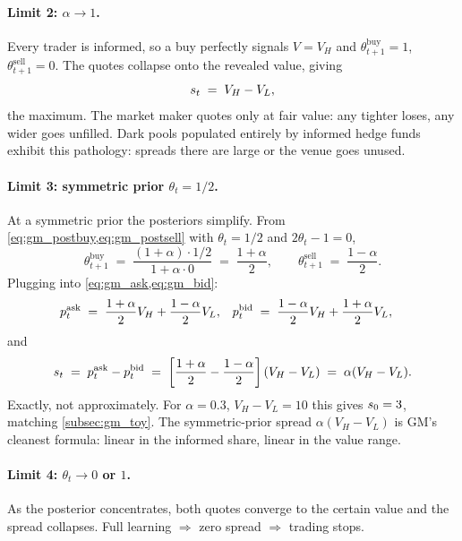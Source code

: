 \paragraph{Limit 2: $\alpha \to 1$.} Every trader is informed, so a
buy perfectly signals $V = V_H$ and $\theta_{t+1}^{\text{buy}} = 1$,
$\theta_{t+1}^{\text{sell}} = 0$. The quotes collapse onto the
revealed value, giving
\[
  s_t \;=\; V_H - V_L,
\]
the maximum. The market maker quotes only at fair value: any
tighter loses, any wider goes unfilled. Dark pools populated
entirely by informed hedge funds exhibit this pathology: spreads
there are large or the venue goes unused.

\paragraph{Limit 3: symmetric prior $\theta_t = 1/2$.} At a
symmetric prior the posteriors simplify. From
\cref{eq:gm_postbuy,eq:gm_postsell} with $\theta_t = 1/2$ and
$2\theta_t - 1 = 0$,
\[
  \theta_{t+1}^{\text{buy}} \;=\; \frac{(1+\alpha) \cdot 1/2}{1 + \alpha \cdot 0}
     \;=\; \frac{1 + \alpha}{2},
  \qquad
  \theta_{t+1}^{\text{sell}} \;=\; \frac{1 - \alpha}{2}.
\]
Plugging into \cref{eq:gm_ask,eq:gm_bid}:
\begin{align*}
  p^{\mathrm{ask}}_t \;&=\; \frac{1+\alpha}{2} V_H + \frac{1-\alpha}{2} V_L,
  &
  p^{\mathrm{bid}}_t \;&=\; \frac{1-\alpha}{2} V_H + \frac{1+\alpha}{2} V_L,
\end{align*}
and
\[
  s_t
  \;=\; p^{\mathrm{ask}}_t - p^{\mathrm{bid}}_t
  \;=\; \left[\frac{1+\alpha}{2} - \frac{1-\alpha}{2}\right](V_H - V_L)
  \;=\; \alpha (V_H - V_L).
\]
Exactly, not approximately. For $\alpha = 0.3$, $V_H - V_L = 10$
this gives $s_0 = 3$, matching \cref{subsec:gm_toy}. The
symmetric-prior spread $\alpha (V_H - V_L)$ is GM's cleanest
formula: linear in the informed share, linear in the value range.

\paragraph{Limit 4: $\theta_t \to 0$ or $1$.} As the posterior
concentrates, both quotes converge to the certain value and the
spread collapses. Full learning $\Rightarrow$ zero spread
$\Rightarrow$ trading stops.

